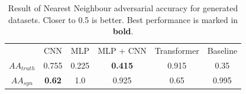 \begin{table}
  \centering
  \caption{Result of Nearest Neighbour adversarial accuracy for generated datasets. Closer to 0.5 is better. Best performance is marked in \textbf{bold}.}
  \label{Fig:nnacc}
  \begin{tabular}{c ccccc}
    \toprule
  & CNN & MLP  & MLP + CNN & Transformer & Baseline \\

  \cmidrule(r){1-1}  \cmidrule(r){2-6} 
   $AA_{truth}$ & 0.755 & 0.225  & \textbf{0.415} & 0.915 & 0.35\\
   $AA_{syn}$& \textbf{0.62} & 1.0  & 0.925 &  0.65 & 0.995 \\


    \bottomrule
  \end{tabular}
\end{table}